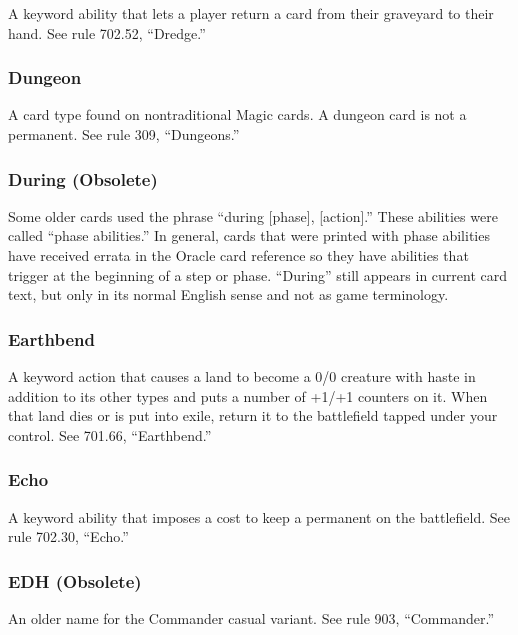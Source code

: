 {{{{{{{A keyword ability that lets a player return a card from their graveyard to their hand. See rule 702.52, “Dredge.”

\subsubsection*{Dungeon}

A card type found on nontraditional Magic cards. A dungeon card is not a permanent. See rule 309, “Dungeons.”

\subsubsection*{During (Obsolete)}

Some older cards used the phrase “during [phase], [action].” These abilities were called “phase abilities.” In general, cards that were printed with phase abilities have received errata in the Oracle card reference so they have abilities that trigger at the beginning of a step or phase. “During” still appears in current card text, but only in its normal English sense and not as game terminology.

\subsubsection*{Earthbend}

A keyword action that causes a land to become a 0/0 creature with haste in addition to its other types and puts a number of +1/+1 counters on it. When that land dies or is put into exile, return it to the battlefield tapped under your control. See 701.66, “Earthbend.”

\subsubsection*{Echo}

A keyword ability that imposes a cost to keep a permanent on the battlefield. See rule 702.30, “Echo.”

\subsubsection*{EDH (Obsolete)}

An older name for the Commander casual variant. See rule 903, “Commander.”

}}}}}}}
